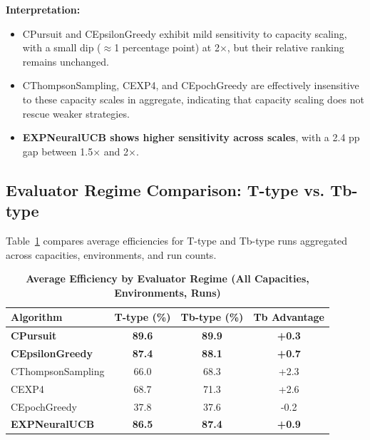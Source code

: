 \documentclass[12pt,a4paper]{article}
\newcommand{\performance}[1]{\textcolor{performancecolor}{\textbf{#1}}}
\newcommand{\legacy}[1]{\textcolor{legacycolor}{\textbf{#1}}}
\begin{document}
\textbf{Interpretation:}
\begin{itemize}
\item CPursuit and CEpsilonGreedy exhibit mild sensitivity to capacity scaling, with a small dip ($\approx$1 percentage point) at 2$\times$, but their relative ranking remains unchanged.
\item CThompsonSampling, CEXP4, and CEpochGreedy are effectively insensitive to these capacity scales in aggregate, indicating that capacity scaling does not rescue weaker strategies.
\item \legacy{EXPNeuralUCB shows higher sensitivity across scales}, with a 2.4 pp gap between 1.5$\times$ and 2$\times$.
\end{itemize}

\subsection{Evaluator Regime Comparison: T-type vs. Tb-type}

Table~\ref{tab:regime-comparison} compares average efficiencies for T-type and Tb-type runs aggregated across capacities, environments, and run counts.

\begin{table}[H]
\centering
\caption{\performance{Average Efficiency by Evaluator Regime (All Capacities, Environments, Runs)}}
\label{tab:regime-comparison}
\begin{tabular}{|l|c|c|c|}
\hline
\textbf{Algorithm} & \textbf{T-type (\%)} & \textbf{Tb-type (\%)} & \textbf{Tb Advantage} \\
\hline
\hline
\performance{CPursuit}        & \performance{89.6} & \performance{89.9} & \performance{+0.3} \\
\performance{CEpsilonGreedy} & \performance{87.4} & \performance{88.1} & \performance{+0.7} \\
CThompsonSampling            & 66.0              & 68.3              & +2.3 \\
CEXP4                        & 68.7              & 71.3              & +2.6 \\
CEpochGreedy                 & 37.8              & 37.6              & -0.2 \\
\legacy{EXPNeuralUCB}        & \legacy{86.5}     & \legacy{87.4}     & \legacy{+0.9} \\
\hline
\end{tabular}
\end{table}
\end{document}
